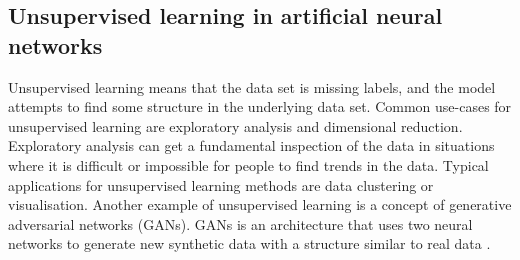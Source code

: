\subsection{Unsupervised learning in artificial neural networks}
Unsupervised learning means that the data set is missing labels, and the model attempts to find some structure in the underlying data set. Common use-cases for unsupervised learning are exploratory analysis and dimensional reduction. Exploratory analysis can get a fundamental inspection of the data in situations where it is difficult or impossible for people to find trends in the data. Typical applications for unsupervised learning methods are data clustering or visualisation. Another example of unsupervised learning is a concept of generative adversarial networks (GANs). GANs is an architecture that uses two neural networks to generate new synthetic data with a structure similar to real data \cite{goodfellowGenerativeAdversarialNets2014}.

